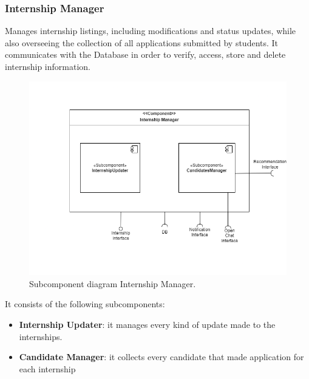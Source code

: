 \subsubsection{Internship Manager} Manages internship listings, including modifications and status updates, while also overseeing the collection of all applications submitted by students.  It communicates with the Database in order to verify, access, store and delete internship information.
    \begin{figure}[htbp]
    \centering
    \includegraphics[width=\linewidth]{DD/Images/Comp&Sub/InternshipManager.png}
    \caption{Subcomponent diagram Internship Manager.}
    \label{fig:internship_manager}
    \end{figure}
    
It consists of the following subcomponents:
\begin{itemize}
    \item  \textbf{Internship Updater}: it manages every kind of update made to the internships.
    \item  \textbf{Candidate Manager}: it collects every candidate that made application for each internship
    \end{itemize}

\clearpage %
